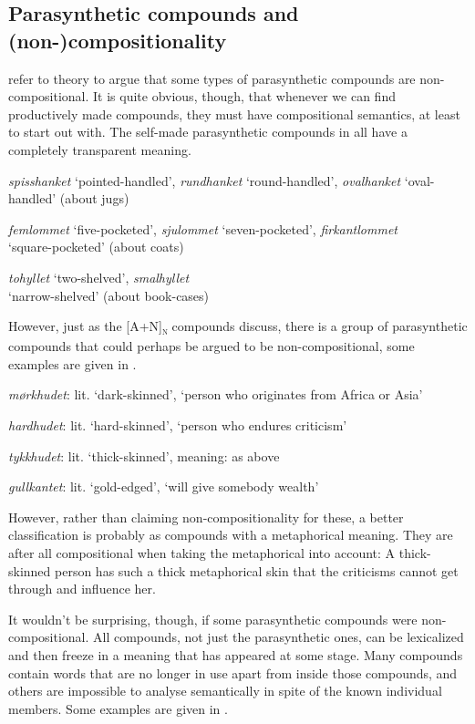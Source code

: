\documentclass[output=paper]{LSP/langsci}
\begin{document}
\subsection{Parasynthetic compounds and (non-)compositionality}

\citet[209]{MelloniBisetto2010} refer to  theory to argue that some types of parasynthetic compounds are non-compositional. It is quite obvious, though, that whenever we can find productively made compounds, they must have compositional semantics, at least to start out with. The self-made parasynthetic compounds in  all have a completely transparent meaning.

\ea%
    \label{ex:bondi:9}
\ea
 \textit{spisshanket} ‘pointed-handled’,  \textit{rundhanket} ‘round-handled’,  \textit{ovalhanket} ‘oval-handled’ (about jugs)

\ex  \textit{femlommet} ‘five-pocketed’, \textit{sjulommet} ‘seven-pocketed’, \textit{firkantlommet} \\
 ‘square-pocketed’ (about coats)

\ex  \textit{tohyllet} ‘two-shelved’, \textit{smalhyllet} \\
 ‘narrow-shelved’ (about book-cases)
\z
\z

\newpage 
However, just as the  [A+N]\textsc{\textsubscript{n}} compounds \citet[209]{MelloniBisetto2010} discuss, there is a group of parasynthetic compounds that could perhaps be argued to be non-compositional, some examples are given in .

\ea \label{ex:bondi:10}

\textit{mørkhudet}: lit. ‘dark-skinned', ‘person who originates from Africa or Asia’

\textit{hardhudet}: lit. ‘hard-skinned', ‘person who endures criticism’

\textit{tykkhudet}: lit. ‘thick-skinned', meaning: as above

\textit{gullkantet}:  lit. ‘gold-edged', ‘will give somebody wealth’
\z

However, rather than claiming non-compositionality for these, a better classification is probably as compounds with a metaphorical meaning. They are after all compositional when taking the metaphorical  into account: A thick-skinned person has such a thick metaphorical skin that the criticisms cannot get through and influence her.

It wouldn’t be surprising, though, if some parasynthetic compounds were non-compositional. All compounds, not just the parasynthetic ones, can be lexicalized and then freeze in a meaning that has appeared at some stage. Many compounds contain words that are no longer in use apart from inside those compounds, and others are impossible to analyse semantically in spite of the known individual members. Some examples are given in .
\end{document}
